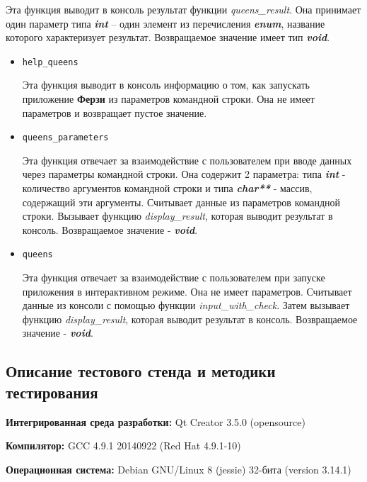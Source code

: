 \documentclass[12pt,a4paper]{report}
\begin{document}
\begin{enumerate}
\begin{itemize}
Эта функция выводит в консоль результат функции \textit{queens\_result}. Она принимает один параметр типа \textit{\textbf{int}} -- один элемент из перечисления \textit{\textbf{enum}}, название которого характеризует результат. Возвращаемое значение имеет тип \textit{\textbf{void}}.
\end{itemize}

\begin{itemize}
\item \verb-help_queens-

Эта функция выводит в консоль информацию о том, как запускать приложение \textbf{Ферзи} из параметров командной строки. Она не имеет параметров и возвращает пустое значение. 
\end{itemize}

\begin{itemize}
\item \verb-queens_parameters-

Эта функция отвечает за взаимодействие с пользователем при вводе данных через параметры командной строки. Она содержит 2 параметра: типа \textbf{\textit{int}} - количество аргументов командной строки и типа \textbf{\textit{char**}} - массив, содержащий эти аргументы. Считывает данные из параметров командной строки. Вызывает функцию \textit{display\_result}, которая выводит результат в консоль. Возвращаемое значение - \textit{\textbf{void}}.
\end{itemize}

\begin{itemize}
\item \verb-queens-

Эта функция отвечает за взаимодействие с пользователем при запуске приложения в интерактивном режиме. Она не имеет параметров. Считывает данные из консоли с помощью функции \textit{input\_with\_check}. Затем вызывает функцию %
\textit{display\_result}, которая выводит результат в консоль. Возвращаемое значение - \textit{\textbf{void}}.
\end{itemize}
\end{enumerate}
\subsection{Описание тестового стенда и методики тестирования}

\begin{flushleft}
\textbf{Интегрированная среда разработки:} Qt Creator 3.5.0 (opensource)

\textbf{Компилятор:} GCC 4.9.1 20140922 (Red Hat 4.9.1-10)

\textbf{Операционная система:} Debian GNU/Linux 8 (jessie) 32-бита (version 3.14.1)
\end{flushleft}
\end{document}

